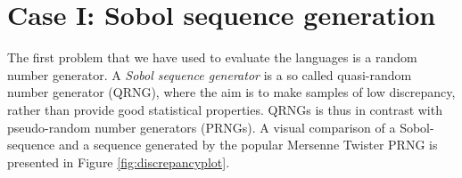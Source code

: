 \documentclass{llncs2e/llncs}
\begin{document}

\section{Case I: Sobol sequence generation}
The first problem that we have used to evaluate the languages is a
random number generator. A \emph{Sobol sequence generator} is a so
called quasi-random number generator (QRNG), where the aim is to make
samples of low discrepancy, rather than provide good statistical
properties. QRNGs is thus in contrast with pseudo-random number
generators (PRNGs). A visual comparison of a Sobol-sequence and a
sequence generated by the popular Mersenne Twister PRNG is presented
in Figure \ref{fig:discrepancyplot}.
\end{document}
